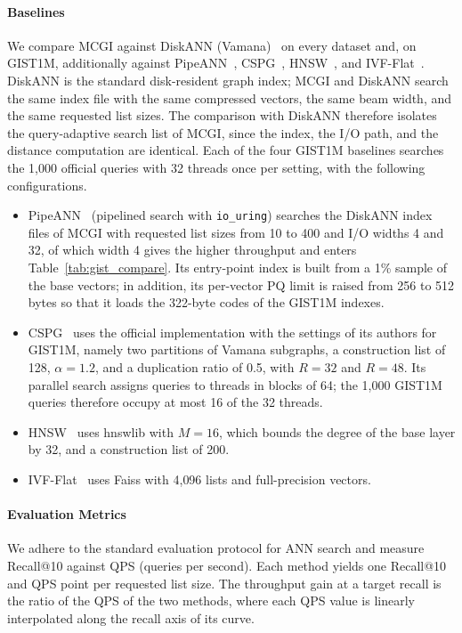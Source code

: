 \documentclass{article}
\theoremstyle{plain}
\theoremstyle{definition}
\theoremstyle{remark}
\newcommand{\ours}{MCGI\xspace}
\begin{document}
\paragraph{Baselines}
We compare \ours{} against DiskANN (Vamana)~\cite{subramanya2019diskann} on every dataset and, on GIST1M, additionally against PipeANN~\cite{osdi25pipeann, fast26odinann}, CSPG~\cite{NEURIPS2024_bab1486c}, HNSW~\cite{malkov2018efficient}, and IVF-Flat~\cite{johnson2019billion}. DiskANN is the standard disk-resident graph index; \ours{} and DiskANN search the same index file with the same compressed vectors, the same beam width, and the same requested list sizes. The comparison with DiskANN therefore isolates the query-adaptive search list of \ours{}, since the index, the I/O path, and the distance computation are identical. Each of the four GIST1M baselines searches the 1{,}000 official queries with 32 threads once per setting, with the following configurations.
\begin{itemize}
    \item PipeANN~\cite{osdi25pipeann, fast26odinann} (pipelined search with \texttt{io\_uring}) searches the DiskANN index files of \ours{} with requested list sizes from 10 to 400 and I/O widths 4 and 32, of which width 4 gives the higher throughput and enters Table~\ref{tab:gist_compare}. Its entry-point index is built from a 1\% sample of the base vectors; in addition, its per-vector PQ limit is raised from 256 to 512 bytes so that it loads the 322-byte codes of the GIST1M indexes.
    \item CSPG~\cite{NEURIPS2024_bab1486c} uses the official implementation with the settings of its authors for GIST1M, namely two partitions of Vamana subgraphs, a construction list of 128, $\alpha = 1.2$, and a duplication ratio of 0.5, with $R = 32$ and $R = 48$. Its parallel search assigns queries to threads in blocks of 64; the 1{,}000 GIST1M queries therefore occupy at most 16 of the 32 threads.
    \item HNSW~\cite{malkov2018efficient} uses hnswlib with $M = 16$, which bounds the degree of the base layer by 32, and a construction list of 200.
    \item IVF-Flat~\cite{johnson2019billion} uses Faiss with 4{,}096 lists and full-precision vectors.
\end{itemize}

\paragraph{Evaluation Metrics}
We adhere to the standard evaluation protocol for ANN search and measure Recall@10 against QPS (queries per second). Each method yields one Recall@10 and QPS point per requested list size. The throughput gain at a target recall is the ratio of the QPS of the two methods, where each QPS value is linearly interpolated along the recall axis of its curve.
\end{document}

